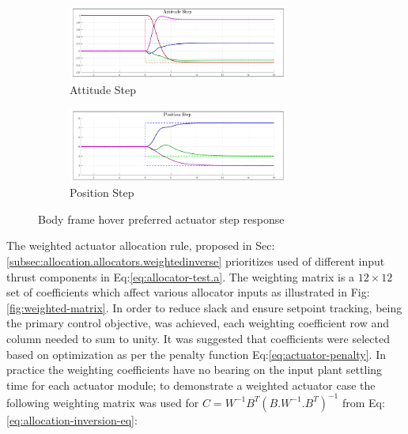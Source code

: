 \begin{figure}[hbtp]
\centering
\begin{subfigure}{\textwidth}
\centering
\includegraphics[width=0.8\textwidth]{graphs/body_norm_attitude}
\caption{Attitude Step}
\label{fig:body_norm_attitude}
\end{subfigure}
\begin{subfigure}{\textwidth}
\centering
\includegraphics[width=0.8\textwidth]{graphs/body_norm_position}
\caption{Position Step}
\label{fig:body_norm_position}
\end{subfigure}
\caption{Body frame hover preferred actuator step response}
\label{fig:body-norm-step}
\end{figure}
\par
The weighted actuator allocation rule, proposed in Sec:\ref{subsec:allocation.allocators.weightedinverse} prioritizes used of different input thrust components in Eq:\ref{eq:allocator-test.a}. The weighting matrix is a $12\times 12$ set of coefficients which affect various allocator inputs as illustrated in Fig:\ref{fig:weighted-matrix}. In order to reduce slack and ensure setpoint tracking, being the primary control objective, was achieved, each weighting coefficient row and column needed to sum to unity. It was suggested that coefficients were selected based on optimization as per the penalty function Eq:\ref{eq:actuator-penalty}. In practice the weighting coefficients have no bearing on the input plant settling time for each actuator module; to demonstrate a weighted actuator case the following weighting matrix was used for $C=W^{-1}B^T(B.W^{-1}.B^T)^{-1}$ from Eq:\ref{eq:allocation-inversion-eq}:
